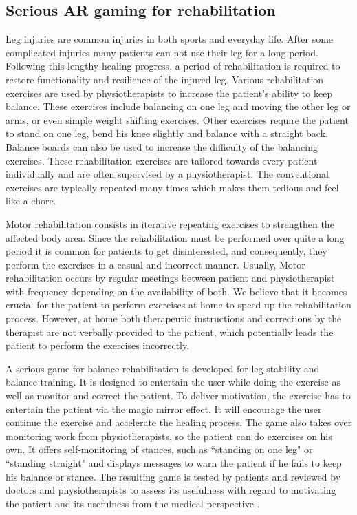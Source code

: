 \subsection{Serious AR gaming for rehabilitation} \label{sec:3-IMR:gaming}
Leg injuries are common injuries in both sports and everyday life. After some complicated injuries many patients can not use their leg for a long period. Following this lengthy healing progress, a period of rehabilitation is required to restore functionality and resilience of the injured leg. Various rehabilitation exercises are used by physiotherapists to increase the patient's ability to keep balance. 
These exercises include balancing on one leg and moving the other leg or arms, or even simple weight shifting exercises. Other exercises require the patient to stand on one leg, bend his knee slightly and balance with a straight back. Balance boards can also be used to increase the difficulty of the balancing exercises. These rehabilitation exercises are tailored towards every patient individually and are often supervised by a physiotherapist. The conventional exercises are typically repeated many times which makes them tedious and feel like a chore.

Motor rehabilitation consists in iterative repeating exercises to strengthen the affected body area. Since the rehabilitation must be performed over quite a long period it is common for patients to get disinterested, and consequently, they perform the exercises in a casual and incorrect manner. 
Usually, Motor rehabilitation occurs by regular meetings between patient and physiotherapist with frequency depending on the availability of both. We believe that it becomes crucial for the patient to perform exercises at home to speed up the rehabilitation process. However, at home both therapeutic instructions and corrections by the therapist are not verbally provided to the patient, which potentially leads the patient to perform the exercises incorrectly.

A serious game for balance rehabilitation is developed for leg stability and balance training. It is designed to entertain the user while doing the exercise as well as monitor and correct the patient. To deliver motivation, the exercise has to entertain the patient via the magic mirror effect. It will encourage the user continue the exercise and accelerate the healing process. The game also takes over monitoring work from physiotherapists, so the patient can do exercises on his own. It offers self-monitoring of stances, such as ``standing on one leg" or ``standing straight" and displays messages to warn the patient if he fails to keep his balance or stance.
The resulting game is tested by patients and reviewed by doctors and physiotherapists to assess its usefulness with regard to motivating the patient and its usefulness from the medical perspective \cite{Reichhold2014}.

